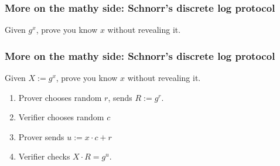 \documentclass[shadesubsections,trans,14pt,mathserif]{beamer}
\newcommand{\defeq}{\ensuremath{:=}}
\begin{document}
\begin{frame}
  \frametitle{More on the mathy side: Schnorr's discrete log protocol}
Given $g^x$, prove you know $x$ without revealing it.
\end{frame}
\begin{frame}
  \frametitle{More on the mathy side: Schnorr's discrete log protocol}
Given $X\defeq g^x$, prove you know $x$ without revealing it.
\vspace{0.4in}
\begin{enumerate}
 \item Prover chooses random $r$, sends $R\defeq g^r$.
 \item Verifier chooses random $c$
 \item Prover sends $u\defeq x\cdot c +r$
\item Verifier checks $X\cdot R = g^u$. 
\end{enumerate}

\end{frame}
\end{document}
